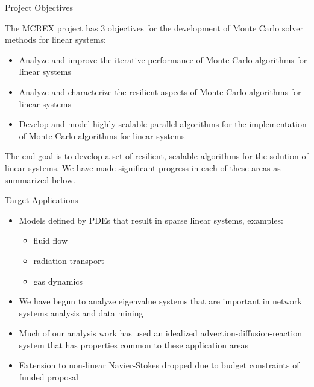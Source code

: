 \documentclass{beamer}
\begin{document}
\begin{frame}{Project Objectives}

  The MCREX project has 3 objectives for the development of Monte Carlo solver
  methods for linear systems:
  \begin{itemize}
  \item Analyze and improve the iterative performance of Monte Carlo
    algorithms for linear systems
  \item Analyze and characterize the resilient aspects of Monte Carlo
    algorithms for linear systems
  \item Develop and model highly scalable parallel algorithms for the
    implementation of Monte Carlo algorithms for linear systems
 \end{itemize}
 The end goal is to develop a set of resilient, scalable algorithms for the
 solution of linear systems.  We have made significant progress in each of
 these areas as summarized below.

\end{frame}


\begin{frame}{Target Applications}

  \begin{itemize}

  \item Models defined by PDEs that result in sparse linear systems, examples:
    \begin{itemize}
    \item fluid flow
    \item radiation transport
    \item gas dynamics
    \end{itemize}

  \item We have begun to analyze eigenvalue systems that are important in
    network systems analysis and data mining

  \item Much of our analysis work has used an idealized
    advection-diffusion-reaction system that has properties common to these
    application areas

  \item Extension to non-linear Navier-Stokes dropped due to budget
    constraints of funded proposal
  \end{itemize}

\end{frame}
\end{document}
